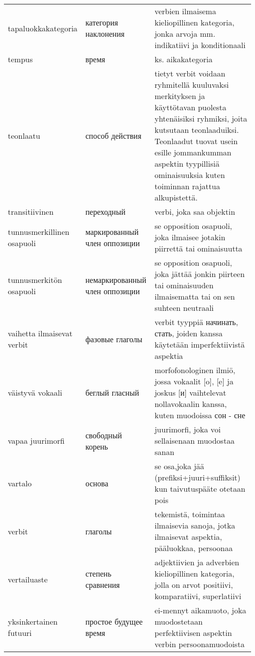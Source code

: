 \begin{longtable}[c]{@{}lll@{}}
tapaluokkakategoria & категория наклонения & verbien ilmaisema
kieliopillinen kategoria, jonka arvoja mm. indikatiivi ja
konditionaali\tabularnewline
tempus & время & ks. aikakategoria\tabularnewline
teonlaatu & способ действия & tietyt verbit voidaan ryhmitellä
kuuluvaksi merkityksen ja käyttötavan puolesta yhtenäisiksi ryhmiksi,
joita kutsutaan teonlaaduiksi. Teonlaadut tuovat usein esille
jommankumman aspektin tyypillisiä ominaisuuksia kuten toiminnan rajattua
alkupistettä.\tabularnewline
transitiivinen & переходный & verbi, joka saa objektin\tabularnewline
tunnusmerkillinen osapuoli & маркированный член оппозиции & se
opposition osapuoli, joka ilmaisee jotakin piirrettä tai
ominaisuutta\tabularnewline
tunnusmerkitön osapuoli & немаркированный член оппозиции & se opposition
osapuoli, joka jättää jonkin piirteen tai ominaisuuden ilmaisematta tai
on sen suhteen neutraali\tabularnewline
vaihetta ilmaisevat verbit & фазовые глаголы & verbit tyyppiä начинать,
стать, joiden kanssa käytetään imperfektiivistä aspektia\tabularnewline
väistyvä vokaali & беглый гласный & morfofonologinen ilmiö, jossa
vokaalit {[}o{]}, {[}e{]} ja joskus {[}и{]} vaihtelevat nollavokaalin
kanssa, kuten muodoissa сон - сне\tabularnewline
vapaa juurimorfi & свободный корень & juurimorfi, joka voi sellaisenaan
muodostaa sanan\tabularnewline
vartalo & основа & se osa,joka jää (prefiksi+juuri+suffiksit) kun
taivutuspääte otetaan pois\tabularnewline
verbit & глаголы & tekemistä, toimintaa ilmaisevia sanoja, jotka
ilmaisevat aspektia, pääluokkaa, persoonaa\tabularnewline
vertailuaste & степень сравнения & adjektiivien ja adverbien
kieliopillinen kategoria, jolla on arvot positiivi, komparatiivi,
superlatiivi\tabularnewline
yksinkertainen futuuri & простое будущее время & ei-mennyt aikamuoto,
joka muodostetaan perfektiivisen aspektin verbin
persoonamuodoista\tabularnewline
\bottomrule
\end{longtable}

